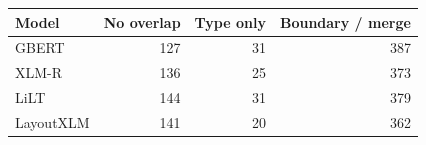 \begin{tabular}{@{}lrrr@{}}
\toprule
Model & No overlap & Type only & Boundary / merge \\
\midrule
GBERT & 127 & 31 & 387 \\
XLM-R & 136 & 25 & 373 \\
LiLT & 144 & 31 & 379 \\
LayoutXLM & 141 & 20 & 362 \\
\bottomrule
\end{tabular}
